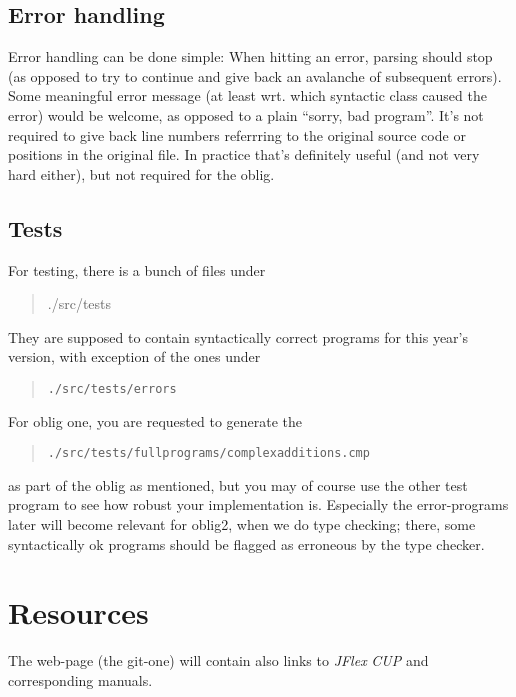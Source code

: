 \documentclass[10pt,freeform]{handout}[2014/08/13]
\begin{document}
\subsection{Error handling}
\label{sec:error-handling}

Error handling can be done simple: When hitting an error, parsing should
stop (as opposed to try to continue and give back an avalanche of
subsequent errors). Some meaningful error message (at least wrt. which
syntactic class caused the error) would be welcome, as opposed to a plain
``sorry, bad program''. It's not required to give back line numbers
referrring to the original source code or positions in the original
file. In practice that's definitely useful (and not very hard either), but
not required for the oblig.




\subsection{Tests}
\label{sec:tests}

For testing, there is a bunch of files under

\begin{quote}
  ./src/tests
\end{quote}

They are supposed to contain syntactically correct programs for this year's
version, with exception of the ones under
\begin{quote}
  \texttt{./src/tests/errors}
\end{quote}


For oblig one, you are requested to generate the 
\begin{quote}
  \texttt{./src/tests/fullprograms/complexadditions.cmp}  
\end{quote}
as part of the oblig as mentioned, but you may of course use the other test
program to see how robust your implementation is. Especially the
error-programs later will become relevant for oblig2, when we do type
checking; there, some syntactically ok programs should be flagged as
erroneous by the type checker.







\section{Resources}
\label{sec:resources}

The web-page (the git-one) will contain also links to \textsl{JFlex}
\textsl{CUP} and corresponding manuals.
\end{document}
